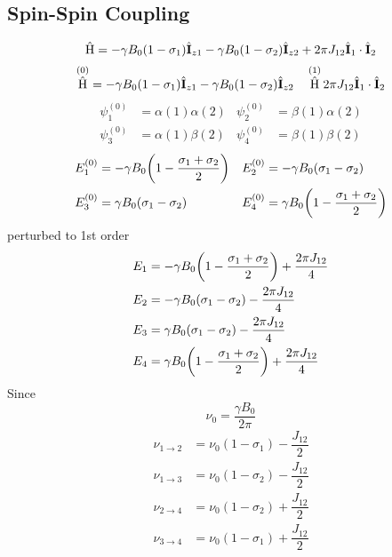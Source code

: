 \documentclass[a4paper]{article}
\DeclareMathOperator{\ra}{\rightarrow}
\DeclareMathOperator{\hH}{\hat{H}}
\numberwithin{equation}{section}
\begin{document}
\subsection{Spin-Spin Coupling}
\begin{equation}\label{key}
\hH = -\gamma B_0(1-\sigma_1)\hat{\vb{I}}_{z1} -\gamma B_0(1-\sigma_2)\hat{\vb{I}}_{z2} + {2\pi J_{12}}\hat{\vb{I}}_1 \cdot \hat{\vb{I}}_2
\end{equation}
\begin{equation}\label{key}
\hH^{(0)} = -\gamma B_0(1-\sigma_1)\hat{\vb{I}}_{z1} -\gamma B_0(1-\sigma_2)\hat{\vb{I}}_{z2} \quad \hH^{(1)} {2\pi J_{12}}\hat{\vb{I}}_1 \cdot \hat{\vb{I}}_2
\end{equation}
\begin{align}
\psi_1^{(0)} &= \alpha(1)\alpha(2) & \psi_2^{(0)} &= \beta(1)\alpha(2)\\
\psi_3^{(0)} &= \alpha(1)\beta(2) & \psi_4^{(0)} &= \beta(1)\beta(2)
\end{align}
\begin{align}
E_1^{(0)} &= -\gamma B_0\qty(1 - \dfrac{\sigma_1 + \sigma_2}{2}) &
E_2^{(0)} &= -\gamma B_0(\sigma_1 - \sigma_2)\\
E_3^{(0)} &= \gamma B_0(\sigma_1 - \sigma_2) &
E_4^{(0)} &= \gamma B_0\qty(1 - \dfrac{\sigma_1 + \sigma_2}{2})
\end{align}
perturbed to 1st order
\begin{align}
E_1 &= -\gamma B_0\qty(1 - \dfrac{\sigma_1 + \sigma_2}{2}) + \dfrac{2\pi J_{12}}{4} \\
E_2 &= -\gamma B_0(\sigma_1 - \sigma_2) - \dfrac{2\pi J_{12}}{4}\\
E_3 &= \gamma B_0(\sigma_1 - \sigma_2) - \dfrac{2\pi J_{12}}{4} \\
E_4 &= \gamma B_0\qty(1 - \dfrac{\sigma_1 + \sigma_2}{2}) + \dfrac{2\pi J_{12}}{4}
\end{align}
Since
\begin{equation}\label{key}
\nu_0 = \dfrac{\gamma B_0}{2\pi}
\end{equation}
\begin{align}
\nu_{1\ra 2} &= \nu_0(1 - \sigma_1) - \dfrac{J_{12}}{2}\\
\nu_{1\ra 3} &= \nu_0(1 - \sigma_2) - \dfrac{J_{12}}{2}\\
\nu_{2\ra 4} &= \nu_0(1 - \sigma_2) + \dfrac{J_{12}}{2}\\
\nu_{3\ra 4} &= \nu_0(1 - \sigma_1) + \dfrac{J_{12}}{2}
\end{align}
\end{document}
